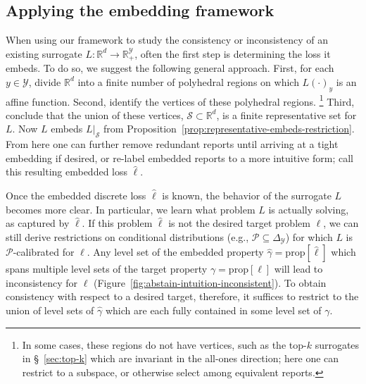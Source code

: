 \documentclass[twoside,11pt]{article}
\newcommand{\reals}{\mathbb{R}}
\newcommand{\prop}[1]{\mathrm{prop}[#1]}
\newcommand{\simplex}{\Delta_\Y}
\renewcommand{\P}{\mathcal{P}}
\newcommand{\Sc}{\mathcal{S}}
\newcommand{\Y}{\mathcal{Y}}
\begin{document}
\subsection{Applying the embedding framework}
\label{sec:apply-embedd-fram}

When using our framework to study the consistency or inconsistency of an existing surrogate $L:\reals^d \to \reals^\Y_+$, often the first step is determining the loss it embeds.
To do so, we suggest the following general approach.
First, for each $y\in\Y$, divide $\reals^d$ into a finite number of polyhedral regions on which $L(\cdot)_y$ is an affine function.
Second, identify the vertices of these polyhedral regions.%
\footnote{In some cases, these regions do not have vertices, such as the top-$k$ surrogates in \S~\ref{sec:top-k} which are invariant in the all-ones direction; here one can restrict to a subspace, or otherwise select among equivalent reports.}
Third, conclude that the union of these vertices, $\Sc\subset\reals^d$, is a finite representative set for $L$.
Now $L$ embeds $L|_\Sc$ from Proposition~\ref{prop:representative-embeds-restriction}.
From here one can further remove redundant reports until arriving at a tight embedding if desired, or re-label embedded reports to a more intuitive form; call this resulting embedded loss $\hat \ell$.

Once the embedded discrete loss $\hat\ell$ is known, the behavior of the surrogate $L$ becomes more clear.
In particular, we learn what problem $L$ is actually solving, as captured by $\hat\ell$.
If this problem $\hat\ell$ is not the desired target problem $\ell$, we can still derive restrictions on conditional distributions (e.g., $\P \subseteq \simplex$) for which $L$ is $\P$-calibrated for $\ell$.
Any level set of the embedded property $\hat\gamma = \prop{\hat\ell}$ which spans multiple level sets of the target property $\gamma=\prop{\ell}$ will lead to inconsistency for $\ell$ (Figure~\ref{fig:abstain-intuition-inconsistent}).
To obtain consistency with respect to a desired target, therefore, it suffices to restrict to the union of level sets of $\hat\gamma$ which are each fully contained in some level set of $\gamma$.
\end{document}
